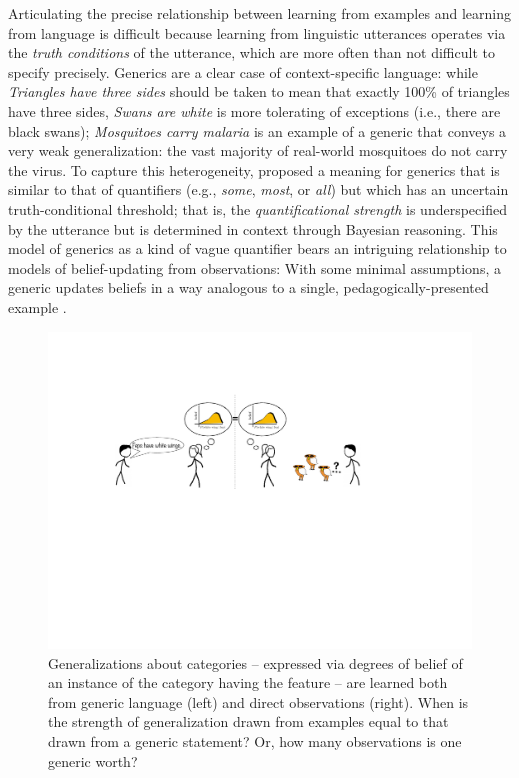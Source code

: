 \documentclass[10pt,letterpaper]{article}
\newcommand{\mht}[1]{\textcolor{Blue}{[mht: #1]}}
\begin{document}

Articulating the precise relationship between learning from examples and learning from language is difficult because learning from linguistic utterances operates via the \emph{truth conditions} of the utterance, which are more often than not difficult to specify precisely. %
Generics are a clear case of context-specific language:  while \emph{Triangles have three sides} should be taken to mean that exactly 100\% of triangles have three sides, \emph{Swans are white} is more tolerating of exceptions (i.e., there are black swans); \emph{Mosquitoes carry malaria} is an example of a generic that conveys a very weak generalization: the vast majority of real-world mosquitoes do not carry the virus. 
To capture this heterogeneity,  proposed a meaning for generics that is similar to that of quantifiers (e.g., \emph{some}, \emph{most}, or \emph{all}) but which has an uncertain truth-conditional threshold; that is, the \emph{quantificational strength} is underspecified by the utterance but is determined in context through Bayesian reasoning. 
This model of generics as a kind of vague quantifier bears an intriguing relationship to models of belief-updating from observations: With some minimal assumptions, a generic updates beliefs in a way analogous to a single, pedagogically-presented example \cite{tessler2020learning}. 

\begin{figure}[t]
\begin{center}
\includegraphics[width=\linewidth]{figs/cartoon-fig.pdf}
\end{center}
\caption{Generalizations about categories -- expressed via degrees of belief of an instance of the category having the feature -- are learned both from generic language (left) and direct observations (right). When is the strength of generalization drawn from examples equal to that drawn from a generic statement? Or, how many observations is one generic worth?}
\label{fig:cartoon}
\end{figure}
\end{document}
